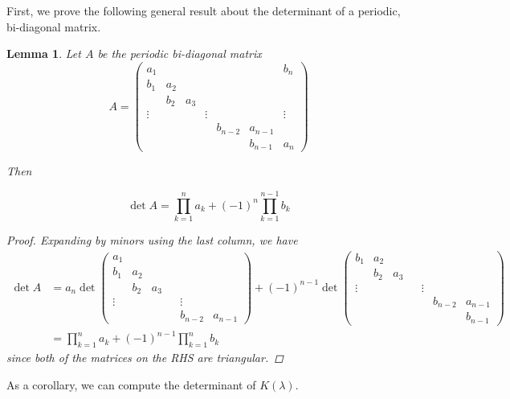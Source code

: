\documentclass[12pt]{article}
\newtheorem{lemma}{Lemma}
\begin{document}
First, we prove the following general result about the determinant of a periodic, bi-diagonal matrix.


\begin{lemma}\label{bidiag}
Let $A$ be the periodic bi-diagonal matrix
\begin{equation}
A = \begin{pmatrix}
a_1 & & & & & & b_n \\
b_1 & a_2 \\
& b_2 & a_3 \\
\vdots & & & \vdots & &&  \vdots \\
& & & & b_{n-2} & a_{n-1} \\
& & & & & b_{n-1} & a_n
\end{pmatrix}
\end{equation}

Then 

\begin{equation}
\det{A} = \prod_{k = 1}^n a_k + (-1)^n \prod_{k = 1}^{n-1} b_k
\end{equation}

\begin{proof}
Expanding by minors using the last column, we have
\begin{align*}
\det A &= a_n \det
\begin{pmatrix}
a_1 \\
b_1 & a_2 \\
& b_2 & a_3 \\
\vdots & & & & \vdots \\
& & & & b_{n-2} & a_{n-1}
\end{pmatrix}
+ (-1)^{n-1} \det
\begin{pmatrix}
b_1 & a_2 \\
& b_2 & a_3 \\
\vdots & & & & \vdots \\
& & & & & b_{n-2} & a_{n-1} \\
& & & & & & b_{n-1}
\end{pmatrix} \\
&= \prod_{k = 1}^n a_k + (-1)^{n-1} \prod_{k = 1}^n b_k
\end{align*}
since both of the matrices on the RHS are triangular.
\end{proof}
\end{lemma}

As a corollary, we can compute the determinant of $K(\lambda)$.

\end{document}
